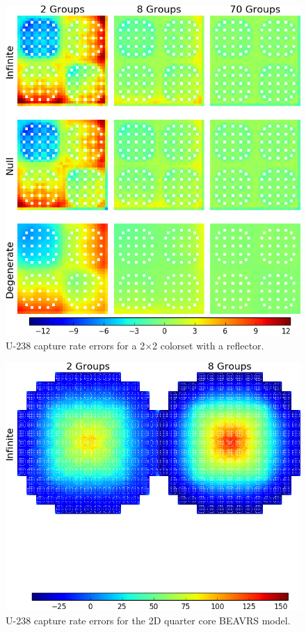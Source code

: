 \begin{figure}[h!]
\centering
\includegraphics[width=\linewidth]{figures/quantification/reflector/capt-err}
\caption[U-238 capture rate errors for a 2$\times$2 colorset with a reflector]{U-238 capture rate errors for a 2$\times$2 colorset with a reflector.}
\label{fig:chap8-reflector-capt-err}
\end{figure}

\begin{figure}[h!]
\centering
\includegraphics[width=\linewidth]{figures/quantification/full-core/capt-err}
\caption[U-238 capture rate errors for the 2D quarter core \ac{BEAVRS} model]{U-238 capture rate errors for the 2D quarter core \ac{BEAVRS} model.}
\label{fig:chap8-full-core-capt-err}
\end{figure}


